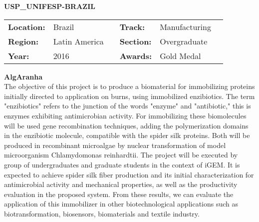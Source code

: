 \noindent\textbf{\uppercase{USP\_UNIFESP-Brazil}} 
\FloatBarrier
\begin{table}[h]
\begin{tabular}{lp{2.5cm}llll}
\textbf{Location:} & Brazil & \multicolumn{1}{|l}{} & \textbf{Track:} & Manufacturing \\
\textbf{Region:} & Latin America   & \multicolumn{1}{|l}{} & \textbf{Section:} & Overgraduate \\
\textbf{Year:}     & 2016   & \multicolumn{1}{|l}{} & \textbf{Awards:}  & Gold Medal
\end{tabular}
\end{table} 
\FloatBarrier
\noindent\textbf{AlgAranha} \vspace{.2cm}\\
The objective of this project is to produce a biomaterial for immobilizing proteins initially directed to application on burns, using immobilized enzibiotics. The term "enzibiotics" refers to the junction of the words "enzyme" and "antibiotic," this is enzymes exhibiting antimicrobian activity. For immobilizing these biomolecules will be used gene recombination techniques, adding the polymerization domains in the enzibiotic molecule, compatible with the spider silk proteins. Both will be produced in recombinant microalgae by nuclear transformation of model microorganism Chlamydomonas reinhardtii. The project will be executed by group of undergraduates and graduate students in the context of iGEM. It is expected to achieve spider silk fiber production and its initial characterization for antimicrobial activity and mechanical properties, as well as the productivity evaluation in the proposed system. From these results, we can evaluate the application of this immobilizer in other biotechnological applications such as biotransformation, biosensors, biomaterials and textile industry.
\vspace{2cm}

